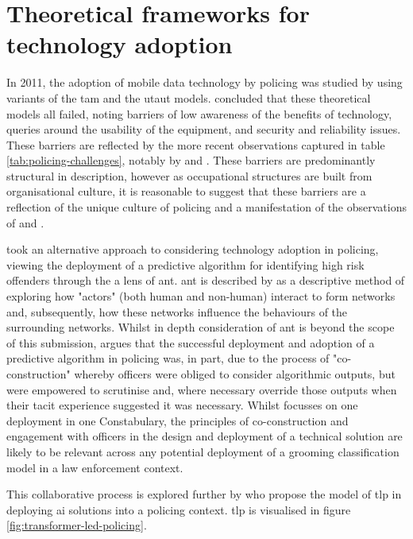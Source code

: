 \documentclass[12pt,a4paper,oneside]{report}
\begin{document}
\section{Theoretical frameworks for technology adoption}
\label{sec:theoretical-frameworks-for-technology-adoption}
In 2011, the adoption of mobile data technology by policing was studied by \citet{lindsay2011adapted} using variants of the \gls{tam} and the \gls{utaut} models.  \citet{lindsay2011adapted} concluded that these theoretical models all failed, noting barriers of low awareness of the benefits of technology, queries around the usability of the equipment, and security and reliability issues.  These barriers are reflected by the more recent observations captured in table \ref{tab:policing-challenges}, notably by \citet{laufs2022technological} and \citet{ratcliffe2020conflicts}.  These barriers are predominantly structural in description, however as occupational structures are built from organisational culture, it is reasonable to suggest that these barriers are a reflection of the unique culture of policing and a manifestation of the observations of \citet{gundhus2013experience} and \citet{ratcliffe2020conflicts}.

\citet{marciniak2023algorithmic} took an alternative approach to considering technology adoption in policing, viewing the deployment of a predictive algorithm for identifying high risk offenders through the a lens of \gls{ant}.  \gls{ant} is described by \citet{dolwick2009social} as a descriptive method of exploring how "actors" (both human and non-human) interact to form networks and, subsequently, how these networks influence the behaviours of the surrounding networks.  Whilst in depth consideration of \gls{ant} is beyond the scope of this submission, \citet{marciniak2023algorithmic} argues that the successful deployment and adoption of a predictive algorithm in policing was, in part, due to the process of "co-construction" whereby officers were obliged to consider algorithmic outputs, but were empowered to scrutinise and, where necessary override those outputs when their tacit experience suggested it was necessary.  Whilst \citet{marciniak2023algorithmic} focusses on one deployment in one Constabulary, the principles of co-construction and engagement with officers in the design and deployment of a technical solution are likely to be relevant across any potential deployment of a grooming classification model in a law enforcement context.

This collaborative process is explored further by \citet{halford2025transformer} who propose the model of \gls{tlp} in deploying \gls{ai} solutions into a policing context.  \gls{tlp} is visualised in figure \ref{fig:transformer-led-policing}.
\end{document}
